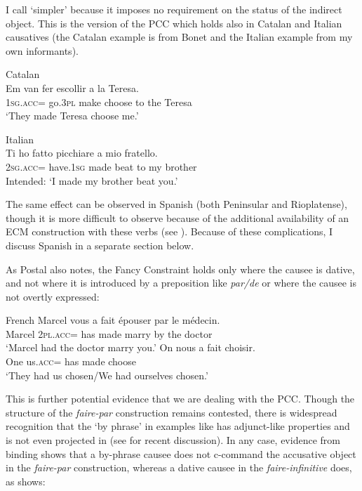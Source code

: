 \documentclass[output=paper,colorlinks,citecolor=brown,nonflat]{langsci/langscibook}
\begin{document}
I call  ‘simpler’ because it imposes no requirement on the status of the indirect object. This is the version of the PCC which holds also in Catalan and Italian causatives (the Catalan example is from Bonet and the Italian example from my own informants).

\ea%
    \label{ex:sheehan:17}
    Catalan \citep[195]{Bonet1991}\\
    \gll   *Em       van     fer     escollir   a   la   Teresa.\\
            \textsc{1sg}.\textsc{acc}=  go.\textsc{3pl}   make   choose   to   the   Teresa\\
    \glt ‘They made Teresa choose me.’
\z

\ea%
    \label{ex:sheehan:18}
    Italian\\
    \gll   *Ti     ho     fatto   picchiare     a   mio   fratello.\\
         \textsc{2sg}.\textsc{acc}=  have.\textsc{1sg}   made beat         to   my   brother\\
    \glt    Intended: ‘I made my brother beat you.’
\z

The same effect can be observed in Spanish (both Peninsular and Rioplatense), though it is more difficult to observe because of the additional availability of an ECM construction with these verbs (see \citealt{Strozer1976, Torrego2010}). Because of these complications, I discuss Spanish in a separate section below.

As Postal also notes, the Fancy Constraint holds only where the causee is dative, and not where it is introduced by a preposition like \textit{par/de} or where the causee is not overtly expressed:

\ea%
    \label{ex:sheehan:19}
    French \citep[3]{Postal1989}
    \ea\label{ex:sheehan:19a}
    \gll    Marcel vous     a  fait   épouser   par   le   médecin.\\
            Marcel \textsc{2pl}.\textsc{acc}=  has  made   marry   by   the   doctor\\
    \glt ‘Marcel had the doctor marry you.’
    \ex\label{ex:sheehan:19b}
    \gll   On  nous     a   fait choisir.\\
            One   us.\textsc{acc}=  has   made choose\\
    \glt    ‘They had us chosen/We had ourselves chosen.’
    \z
\z

This is further potential evidence that we are dealing with the PCC. Though the structure of the \textit{faire-par} construction remains contested, there is widespread recognition that the ‘by phrase’ in examples like  has adjunct-like properties and is not even projected in  (see \citealt{Guasti1996, FolliHarley2007, SheehanCyrino2016} for recent discussion). In any case, evidence from binding shows that a by-phrase causee does not c-command the accusative object in the \textit{faire-par} construction, whereas a dative causee in the \textit{faire-infinitive} does, as \citet{Burzio1986} shows:
\end{document}
